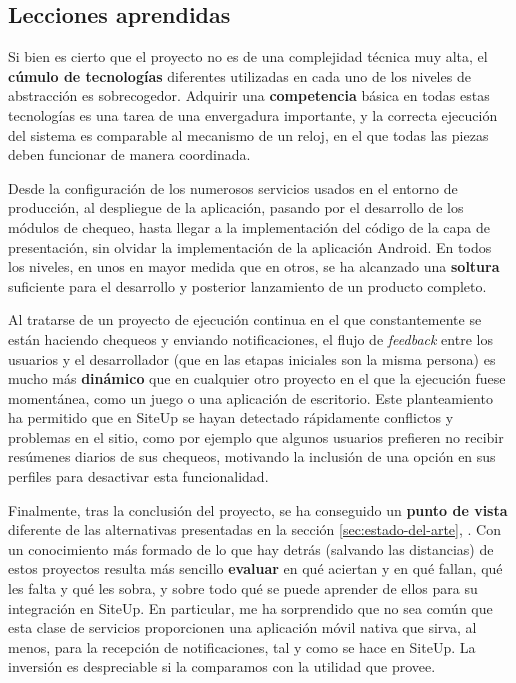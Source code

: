 \subsection{Lecciones aprendidas}

Si bien es cierto que el proyecto no es de una complejidad técnica muy alta, el
\textbf{cúmulo de tecnologías} diferentes utilizadas en cada uno de los niveles
de abstracción es sobrecogedor. Adquirir una \textbf{competencia} básica en
todas estas tecnologías es una tarea de una envergadura importante, y la
correcta ejecución del sistema es comparable al mecanismo de un reloj, en el que
todas las piezas deben funcionar de manera coordinada.

Desde la configuración de los numerosos servicios usados en el entorno de
producción, al despliegue de la aplicación, pasando por el desarrollo de los
módulos de chequeo, hasta llegar a la implementación del código de la capa de
presentación, sin olvidar la implementación de la aplicación Android. En todos
los niveles, en unos en mayor medida que en otros, se ha alcanzado una
\textbf{soltura} suficiente para el desarrollo y posterior lanzamiento de un
producto completo.

Al tratarse de un proyecto de ejecución continua en el que constantemente se
están haciendo chequeos y enviando notificaciones, el flujo de \textit{feedback}
entre los usuarios y el desarrollador (que en las etapas iniciales son la misma
persona) es mucho más \textbf{dinámico} que en cualquier otro proyecto en el que
la ejecución fuese momentánea, como un juego o una aplicación de
escritorio. Este planteamiento ha permitido que en SiteUp se hayan detectado
rápidamente conflictos y problemas en el sitio, como por ejemplo que algunos
usuarios prefieren no recibir resúmenes diarios de sus chequeos, motivando la
inclusión de una opción en sus perfiles para desactivar esta funcionalidad.

Finalmente, tras la conclusión del proyecto, se ha conseguido un \textbf{punto
  de vista} diferente de las alternativas presentadas en la sección
\ref{sec:estado-del-arte}, \textit{}. Con un
conocimiento más formado de lo que hay detrás (salvando las distancias) de estos
proyectos resulta más sencillo \textbf{evaluar} en qué aciertan y en qué fallan,
qué les falta y qué les sobra, y sobre todo qué se puede aprender de ellos para
su integración en SiteUp. En particular, me ha sorprendido que no sea común que
esta clase de servicios proporcionen una aplicación móvil nativa que sirva, al
menos, para la recepción de notificaciones, tal y como se hace en SiteUp. La
inversión es despreciable si la comparamos con la utilidad que provee.



